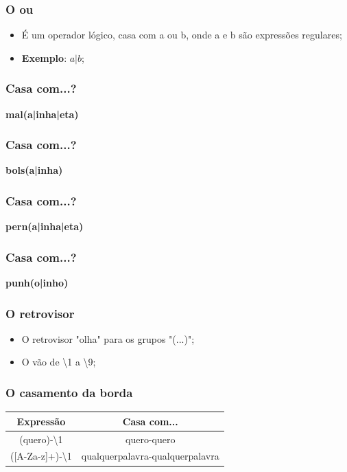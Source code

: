 
\begin{frame}
	\frametitle{O ou}
	\begin{itemize}
		\item É um operador lógico, casa com a ou b, onde a e b são expressões regulares;
		\item \textbf{Exemplo}: $a|b$;
	\end{itemize}
\end{frame}

\begin{frame}
	\frametitle{Casa com...?}
	\Huge{\bf mal(a|inha|eta)}
\end{frame}

\begin{frame}
	\frametitle{Casa com...?}
	\Huge{\bf bols(a|inha)}
\end{frame}

\begin{frame}
	\frametitle{Casa com...?}
	\Huge{\bf pern(a|inha|eta)}
\end{frame}

\begin{frame}
	\frametitle{Casa com...?}
	\Huge{\bf punh(o|inho)}
\end{frame}


\begin{frame}
	\frametitle{O retrovisor}

	\begin{itemize}
		\item O retrovisor "olha" para os grupos "(...)";
		\item O vão de \textbackslash 1 a \textbackslash 9;
	\end{itemize}
\end{frame}

\begin{frame}
	\frametitle{O casamento da borda}
	\begin{center}
	\begin{tabular}{c|c}
		\textbf{Expressão} & \textbf{Casa com...} \\ \hline
		(quero)-\textbackslash 1	& quero-quero \\ \hline
		([A-Za-z]+)-\textbackslash 1  & qualquerpalavra-qualquerpalavra \\ \hline
	\end{tabular}
	\end{center}

\end{frame}
